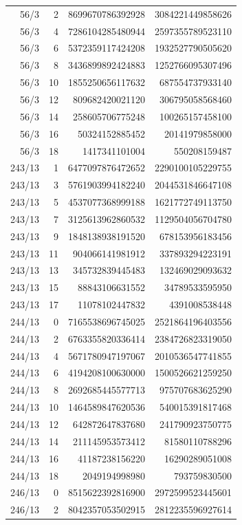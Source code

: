 \begin{longtable}{@{}rrrr@{}}
56/3 & 2 & 8699670786392928 & 3084221449858626\\
56/3 & 4 & 7286104285480944 & 2597355789523110\\
56/3 & 6 & 5372359117424208 & 1932527790505620\\
56/3 & 8 & 3436899892424883 & 1252766095307496\\
56/3 & 10 & 1855250656117632 & 687554737933140\\
56/3 & 12 & 809682420021120 & 306795058568460\\
56/3 & 14 & 258605706775248 & 100265157458100\\
56/3 & 16 & 50324152885452 & 20141979858000\\
56/3 & 18 & 1417341101004 & 550208159487\\
243/13 & 1 & 6477097876472652 & 2290100105229755\\
243/13 & 3 & 5761903994182240 & 2044531846647108\\
243/13 & 5 & 4537077368999188 & 1621772749113750\\
243/13 & 7 & 3125613962860532 & 1129504056704780\\
243/13 & 9 & 1848138938191520 & 678153956183456\\
243/13 & 11 & 904066141981912 & 337893294223191\\
243/13 & 13 & 345732839445483 & 132469029093632\\
243/13 & 15 & 88843106631552 & 34789533595950\\
243/13 & 17 & 11078102447832 & 4391008538448\\
244/13 & 0 & 7165538696745025 & 2521864196403556\\
244/13 & 2 & 6763355820336414 & 2384726823319050\\
244/13 & 4 & 5671780947197067 & 2010536547741855\\
244/13 & 6 & 4194208100630000 & 1500526621259250\\
244/13 & 8 & 2692685445577713 & 975707683625290\\
244/13 & 10 & 1464589847620536 & 540015391817468\\
244/13 & 12 & 642872647837680 & 241790923750775\\
244/13 & 14 & 211145953573412 & 81580110788296\\
244/13 & 16 & 41187238156220 & 16290289051008\\
244/13 & 18 & 2049194998980 & 793759830500\\
246/13 & 0 & 8515622392816900 & 2972599523445601\\
246/13 & 2 & 8042357053502915 & 2812235596927614\\

\end{longtable}
